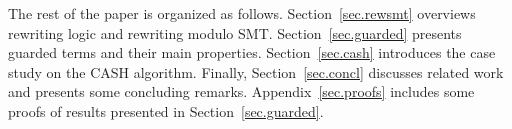 The rest of the paper is organized as
follows. Section~\ref{sec.rewsmt} overviews rewriting logic and
rewriting modulo SMT. Section~\ref{sec.guarded} presents guarded terms
and %
their main properties. Section~\ref{sec.cash}
introduces the case study on the CASH algorithm. Finally,
Section~\ref{sec.concl} discusses related work and presents some
concluding remarks. Appendix~\ref{sec.proofs} includes some proofs of
results presented in Section~\ref{sec.guarded}.
